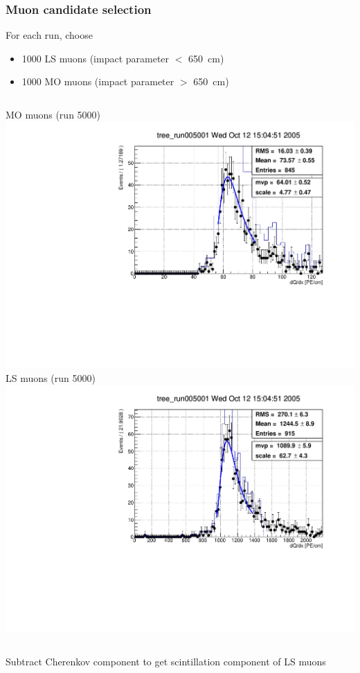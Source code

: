 \documentclass{beamer}
\begin{document}
\begin{frame}
	\frametitle{Muon candidate selection}
	For each run, choose
	\begin{itemize}
		\item 1000 LS muons (impact parameter $<$ \SI{650}{\centi\meter})
		\item 1000 MO muons (impact parameter $>$ \SI{650}{\centi\meter})
	\end{itemize}
	\begin{columns}[t]
		MO muons (run 5000)
		\includegraphics[width=\textwidth]{tree_run005001_cherenID_dQdx.pdf}
		LS muons (run 5000)
		\includegraphics[width=\textwidth]{tree_run005001_scintID_dQdx.pdf}

	\end{columns}
	Subtract Cherenkov component to get scintillation component of LS muons
\end{frame}
\end{document}
